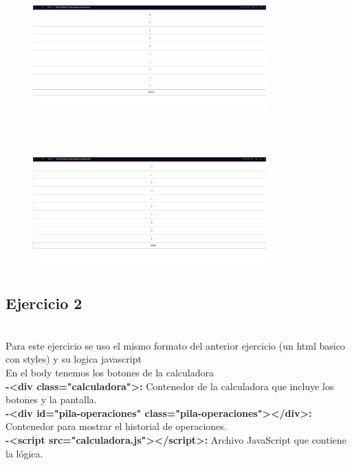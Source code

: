 \documentclass{article}
\begin{document}
    \begin{figure}[H]
		          \centering
		          \includegraphics[width=0.8\textwidth,keepaspectratio]                       {img/pruebaTeclado1.png}
    \end{figure}    
\\
\\
     \begin{figure}[H]
		          \centering
		          \includegraphics[width=0.8\textwidth,keepaspectratio]                       {img/pruebaTeclado2.png}
    \end{figure}    
\subsection{Ejercicio 2}
\\Para este ejercicio se uso el mismo formato del anterior ejercicio (un html basico con styles) y su logica javascript
\\En el body tenemos los botones de la calculadora
\\\textbf{-<div class="calculadora">:} Contenedor de la calculadora que incluye los botones y la pantalla.
\\\textbf{-<div id="pila-operaciones" class="pila-operaciones"></div>:} Contenedor para mostrar el historial de operaciones.
\\\textbf{-<script src="calculadora.js"></script>:} Archivo JavaScript que contiene la lógica.
\end{document}
